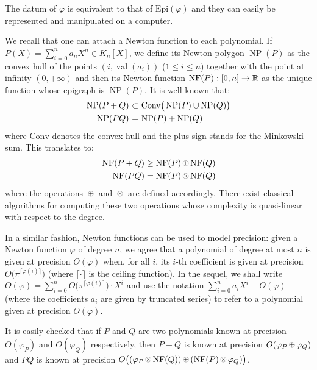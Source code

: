 \documentclass{sig-alternate-05-2015}
\DeclareMathOperator{\NP}{NP}
\DeclareMathOperator{\val}{val}
\newcommand{\R}{\mathbb R}
\newcommand{\NF}{\text{\rm NF}}
\newcommand{\nfop}[1]{%
\raisebox{-0.1mm}{\begin{tikzpicture}
\draw[transparent] (-0.18,0)--(0.18,0);
\draw[very thin] (0,0) circle (0.11cm);
\begin{scope}
\clip (0,0) circle (0.11cm);
\node[scale=0.75] at (0,0) { $#1$ };
\end{scope}
\end{tikzpicture}}}
\newcommand{\nfplus}{\nfop+}
\newcommand{\nftimes}{\nfop\times}
\newcommand{\Epi}{\textrm{Epi}}
\begin{document}
\begin{rem}
The datum of $\varphi$ is equivalent to that of $\Epi(\varphi)$ and they 
can easily be represented and manipulated on a computer.
\end{rem}

We recall that one can attach a Newton function to each polynomial.
If $P(X) = \sum_{i=0}^n a_n X^n \in K_n[X]$, we define its Newton
polygon $\NP(P)$ as the convex hull of the points $(i,\val(a_i))$ 
($1 \leq i \leq n$) together with the point at infinity $(0,+\infty)$
and then its Newton function $\NF(P) : [0,n] \to \R$ as the unique
function whose epigraph is $\NP(P)$. It is well known \cite[Section~1.6]{dwork-geratto-sullivan:Gfunctions} that:
$$\begin{array}{r@{\,\,}c@{\,\,}l}
\NP(P+Q) & \subset & \text{Conv}\big(\NP(P) \cup \NP(Q)\big) \smallskip \\
\NP(PQ) & = & \NP(P) + \NP(Q)
\end{array}$$
where $\text{Conv}$ denotes the convex hull and the plus sign stands 
for the Minkowski sum. This translates to:
$$\begin{array}{r@{\,\,}c@{\,\,}l}
\NF(P+Q) \geq \NF(P) \nfplus \NF(Q) \smallskip \\
\NF(PQ) = \NF(P) \nftimes \NF(Q)
\end{array}$$
where the operations $\nfplus$ and $\nftimes$ are defined accordingly.
There exist classical algorithms for computing these two operations
whose complexity is quasi-linear with respect to the degree.

In a similar fashion, Newton functions can be used to model precision: 
given a Newton function $\varphi$ of degree $n$, we agree that a polynomial 
of degree at most $n$ is given at precision $O(\varphi)$ when, for all $i$,
its $i$-th coefficient is given at precision $O\big(\pi^{\lceil \varphi(i)
\rceil}\big)$ (where $\lceil \cdot \rceil$ is the ceiling function).
In the sequel, we shall write
$O(\varphi) = \sum_{i=0}^n O\big(\pi^{\lceil \varphi(i) \rceil}\big) \cdot X^i$
and use the notation $\sum_{i=0}^n a_i X^i + O(\varphi)$ (where the
coefficients $a_i$ are given by truncated series) to refer to a 
polynomial given at precision $O(\varphi)$.

It is easily checked that if $P$ and $Q$ are two polynomials known at 
precision $O(\varphi_P)$ and $O(\varphi_Q)$ respectively, then $P+Q$ is 
known at precision $O(\varphi_P \nfplus \varphi_Q)$ and $PQ$ is known at 
precision $O\big((\varphi_P \nftimes \NF(Q)) \nfplus (\NF(P) \nftimes 
\varphi_Q)\big)$.
\end{document}
